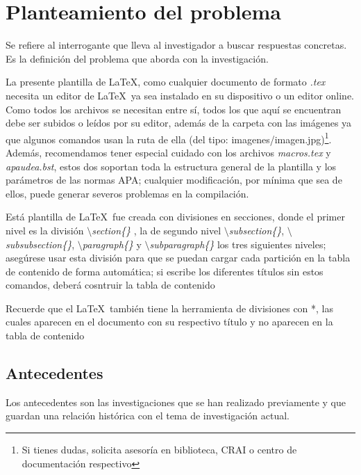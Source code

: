 \section{ Planteamiento del problema}

Se refiere al interrogante que lleva al investigador a buscar respuestas concretas. Es la definición del problema que aborda con la investigación.

La presente plantilla de \LaTeX, como cualquier documento de formato \textit{.tex} necesita un editor de \LaTeX\ ya sea instalado en su dispositivo o un editor online. Como todos los archivos se necesitan entre sí, todos los que aquí se encuentran debe ser subidos o leídos por su editor, además de la carpeta con las imágenes ya que algunos comandos usan la ruta de ella (del tipo: imagenes/imagen.jpg)\footnote{Si tienes dudas, solicita asesoría en biblioteca, CRAI o centro de documentación respectivo}. Además, recomendamos tener especial cuidado con los archivos \textit{macros.tex} y \textit{apaudea.bst}, estos dos soportan toda la estructura general de la plantilla y los parámetros de las normas APA; cualquier modificación, por mínima que sea de ellos, puede generar severos problemas en la compilación.

Está plantilla de \LaTeX \ fue creada con divisiones en secciones, donde el primer nivel es la división \textit{$\setminus$section\{\}} , la de segundo nivel \textit{$\setminus$subsection\{\}}, \textit{$\setminus$subsubsection\{\}}, \textit{$\setminus$paragraph\{\}} y \textit{$\setminus$subparagraph\{\}} los tres siguientes niveles; asegúrese usar esta división para que se puedan cargar cada partición en la tabla de contenido de forma automática; si escribe los diferentes títulos sin estos comandos, deberá cosntruir la tabla de contenido

Recuerde que el \LaTeX\  también tiene la herramienta de divisiones con *, las cuales aparecen en el documento con su respectivo título y no aparecen en la tabla de contenido

\subsection{Antecedentes}

Los antecedentes son las investigaciones que se han realizado previamente y que guardan una relación histórica con el tema de investigación actual. 

\newpage


